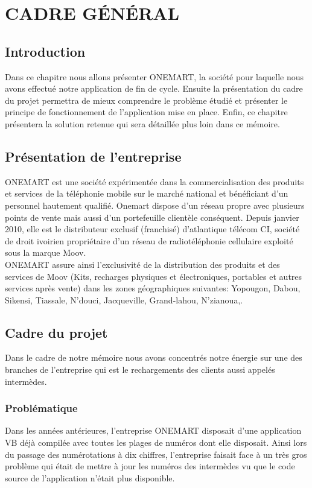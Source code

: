 \chapter{CADRE GÉNÉRAL}
\section{Introduction}
	Dans ce chapitre nous allons présenter ONEMART, la société pour laquelle nous avons effectué notre application de fin de cycle. Ensuite la présentation du cadre du projet permettra de mieux comprendre le problème étudié et présenter le principe de fonctionnement de l'application mise en place.
	Enfin, ce chapitre présentera la solution retenue qui sera détaillée plus loin dans ce mémoire.
\section{Présentation de l'entreprise}
	ONEMART est une société expérimentée dans la commercialisation des produits et services de la téléphonie mobile sur le marché national et bénéficiant d’un personnel hautement qualifié. Onemart dispose d’un réseau propre avec plusieurs points de vente mais aussi d’un portefeuille clientèle conséquent. Depuis janvier 2010, elle est le distributeur exclusif (franchisé) d’atlantique télécom CI, société de droit ivoirien propriétaire d’un réseau de radiotéléphonie cellulaire  exploité sous la marque Moov.\\
	
	ONEMART assure ainsi l’exclusivité de la distribution des produits et des services de Moov (Kits, recharges physiques et électroniques, portables et autres services après vente) dans les zones géographiques suivantes: Yopougon, Dabou, Sikensi, Tiassale, N’douci, Jacqueville, Grand-lahou, N’zianoua,.\\
	
	
\section{Cadre du projet} %
	Dans le cadre de notre mémoire nous avons concentrés notre énergie sur une des branches de l'entreprise qui est le rechargements des clients aussi appelés intermèdes.
\subsection{Problématique}
		Dans les années antérieures, l'entreprise ONEMART disposait d'une application VB déjà compilée avec toutes les plages de numéros dont elle disposait. Ainsi lors du passage des numérotations à dix chiffres, l'entreprise faisait face à un très gros problème qui était de mettre à jour les numéros des intermèdes vu que le code source de l'application n'était plus disponible.
